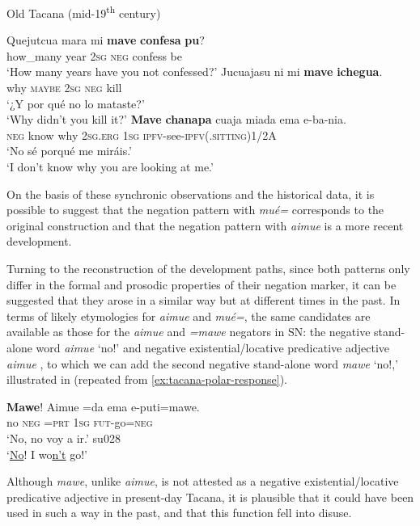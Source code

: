 \documentclass[output=paper]{langsci/langscibook}
\begin{document}
\begin{exe}\ex\label{ex:tacana-old-catecism} Old Tacana
(mid-19\textsuperscript{th} century)
\begin{xlist}
\ex
\gll Quejutcua mara mi \textbf{mave}
\textbf{confesa} \textbf{pu}?\\
    how\_many year \textsc{2sg} \textsc{neg} confess be\\
\glt `How many years have you not confessed?' \parencite[297]{LafoneQuevedo1902}
\ex
\gll Jucuajasu ni mi \textbf{mave}
\textbf{ichegua}.\\
    why  \textsc{maybe}  \textsc{2sg}  \textsc{neg}  kill\\
\glt `¿Y por qué no lo mataste?' \parencite[310]{LafoneQuevedo1902}\\
`Why didn't you kill it?'
\ex
\gll {}\textbf{Mave} \textbf{chanapa} cuaja
 miada ema e-ba-nia.\\
    \textsc{neg}  know  why  \textsc{2sg.erg}  \textsc{1sg}
    \textsc{ipfv}-see-\textsc{ipfv(.sitting)1/2A}\\
\glt `No sé porqué me miráis.' \parencite[310]{LafoneQuevedo1902}\\
`I don't know why you are looking at me.'
\end{xlist}\end{exe}

On the basis of these synchronic observations and the historical data, it is possible to suggest that the negation pattern with \textit{mué=} corresponds to the original construction and that the negation pattern with \textit{aimue} is a more recent development.

Turning to the reconstruction of the development paths, since both patterns
only differ in the formal and prosodic properties of their negation marker,
it can be suggested that they arose in a similar way but at different
times in the past. In terms of likely etymologies for \textit{aimue} and
\textit{mué=}, the same candidates are available as those for the
\textit{aimue} and \textit{=mawe} negators in SN: the negative stand-alone
word \textit{aimue} `no!'  and negative
existential\slash locative predicative adjective \textit{aimue}
, to which we can add the second negative
stand-alone word \textit{mawe} `no!,' illustrated in
 (repeated from \ref{ex:tacana-polar-response}).
%
\begin{exe}\ex\label{ex:tacana-not-to-mass}
\gll \textbf{Mawe}!  Aimue  =da  ema  e-puti=mawe.\\
    no  \textsc{neg}  \textsc{=prt}  \textsc{1sg}
    \textsc{fut}-go=\textsc{neg}\\
\glt `No, no voy a ir.' su028\\
`\underline{No}! I wo\underline{n't} go!'
\end{exe}
%
Although \textit{mawe}, unlike \textit{aimue}, is not attested as a negative existential\slash locative predicative adjective in present-day Tacana, it is plausible that it could have been used in such a way in the past, and that this function fell into disuse.
\end{document}
